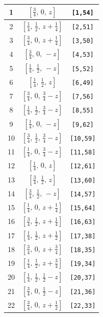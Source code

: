 \documentclass[fleqn,8pt]{jsarticle}
\begin{document}
\begin{longtable}{ccc}
1 & $\left[ \frac{3}{4},\, 0,\, z \right]$ & {\tt [1,54]} \\ \hline
2 & $\left[ \frac{1}{4},\, \frac{1}{2},\, z + \frac{1}{4} \right]$ & {\tt [2,51]} \\ \hline
3 & $\left[ \frac{3}{4},\, 0,\, z + \frac{1}{4} \right]$ & {\tt [3,50]} \\ \hline
4 & $\left[ \frac{3}{4},\, 0,\, - z \right]$ & {\tt [4,53]} \\ \hline
5 & $\left[ \frac{1}{4},\, \frac{1}{2},\, - z \right]$ & {\tt [5,52]} \\ \hline
6 & $\left[ \frac{1}{4},\, \frac{1}{2},\, z \right]$ & {\tt [6,49]} \\ \hline
7 & $\left[ \frac{3}{4},\, 0,\, \frac{3}{4} - z \right]$ & {\tt [7,56]} \\ \hline
8 & $\left[ \frac{1}{4},\, \frac{1}{2},\, \frac{3}{4} - z \right]$ & {\tt [8,55]} \\ \hline
9 & $\left[ \frac{1}{4},\, 0,\, - z \right]$ & {\tt [9,62]} \\ \hline
10 & $\left[ \frac{3}{4},\, \frac{1}{2},\, \frac{3}{4} - z \right]$ & {\tt [10,59]} \\ \hline
11 & $\left[ \frac{1}{4},\, 0,\, \frac{3}{4} - z \right]$ & {\tt [11,58]} \\ \hline
12 & $\left[ \frac{1}{4},\, 0,\, z \right]$ & {\tt [12,61]} \\ \hline
13 & $\left[ \frac{3}{4},\, \frac{1}{2},\, z \right]$ & {\tt [13,60]} \\ \hline
14 & $\left[ \frac{3}{4},\, \frac{1}{2},\, - z \right]$ & {\tt [14,57]} \\ \hline
15 & $\left[ \frac{1}{4},\, 0,\, z + \frac{1}{4} \right]$ & {\tt [15,64]} \\ \hline
16 & $\left[ \frac{3}{4},\, \frac{1}{2},\, z + \frac{1}{4} \right]$ & {\tt [16,63]} \\ \hline
17 & $\left[ \frac{1}{4},\, \frac{1}{2},\, z + \frac{1}{2} \right]$ & {\tt [17,38]} \\ \hline
18 & $\left[ \frac{3}{4},\, 0,\, z + \frac{3}{4} \right]$ & {\tt [18,35]} \\ \hline
19 & $\left[ \frac{1}{4},\, \frac{1}{2},\, z + \frac{3}{4} \right]$ & {\tt [19,34]} \\ \hline
20 & $\left[ \frac{1}{4},\, \frac{1}{2},\, \frac{1}{2} - z \right]$ & {\tt [20,37]} \\ \hline
21 & $\left[ \frac{3}{4},\, 0,\, \frac{1}{2} - z \right]$ & {\tt [21,36]} \\ \hline
22 & $\left[ \frac{3}{4},\, 0,\, z + \frac{1}{2} \right]$ & {\tt [22,33]} \\ \hline

\end{longtable}
\end{document}
